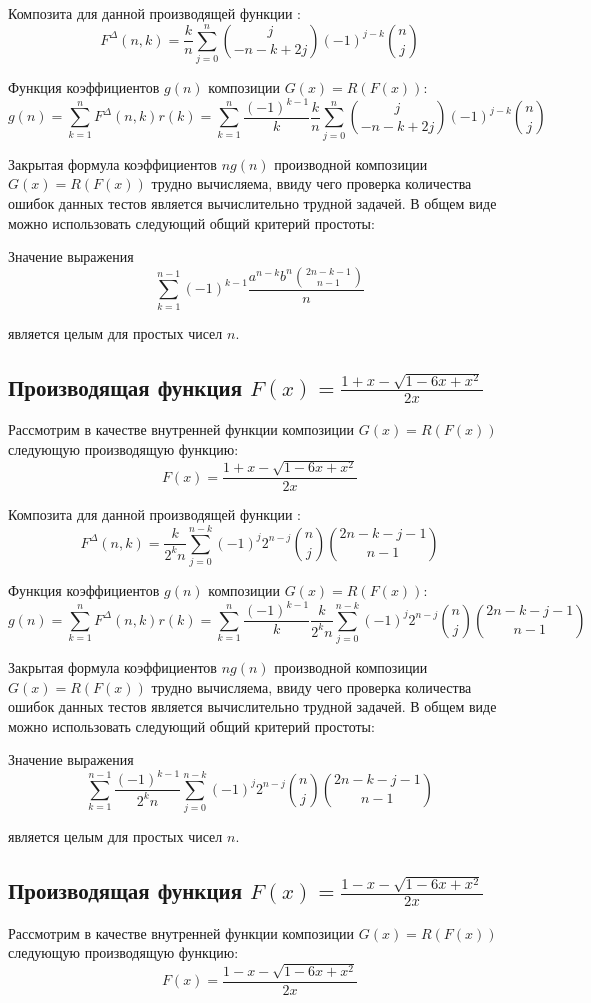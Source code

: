 \documentclass[
russian,
cp1251,
14pt,
simple
]{eskdtext}
\theoremstyle{definition}
\begin{document}
Композита для данной производящей функции \cite{KruchininVV}:
$$
F^\Delta(n,k)=\frac{k}{n} \sum\limits _{j=0}^n{j \choose -n-k+2j}(-1)^{j-k}{n \choose j}
$$

Функция коэффициентов $g(n)$ композиции $G(x)=R(F(x))$:
$$
g(n)=\sum\limits _{k=1}^{n}{F^\Delta(n,k)r(k)}=\sum\limits _{k=1}^{n}\frac{(-1)^{k-1}}{k} 
\frac{k}{n} \sum\limits _{j=0}^n{j \choose -n-k+2j}(-1)^{j-k}{n \choose j}
$$

Закрытая формула коэффициентов $ng(n)$ производной композиции $G(x)=R(F(x))$ трудно вычисляема, ввиду чего проверка количества ошибок данных тестов является вычислительно трудной задачей. В общем виде можно использовать следующий общий критерий простоты:

Значение выражения
$$
\sum\limits _{k=1}^{n-1}(-1)^{k-1}\frac{a^{n-k}b^n{2n-k-1 \choose n-1}}{n}
$$

является целым для простых чисел $n$.

\subsection{Производящая функция $F(x)=\frac{1+x-\sqrt{1-6x+x^2}}{2x}$}
Рассмотрим в качестве внутренней функции композиции $G(x)=R(F(x))$ следующую производящую функцию:
$$
F(x)=\frac{1+x-\sqrt{1-6x+x^2}}{2x}
$$

Композита для данной производящей функции \cite{KruchininVV}:
$$
F^\Delta(n,k)=\frac{k}{2^kn} \sum\limits _{j=0}^{n-k}(-1)^j2^{n-j}{n \choose j}{2n-k-j-1 \choose n-1}
$$

Функция коэффициентов $g(n)$ композиции $G(x)=R(F(x))$:
$$
g(n)=\sum\limits _{k=1}^{n}{F^\Delta(n,k)r(k)}=\sum\limits _{k=1}^{n}\frac{(-1)^{k-1}}{k} 
\frac{k}{2^kn} \sum\limits _{j=0}^{n-k}(-1)^j2^{n-j}{n \choose j}{2n-k-j-1 \choose n-1}
$$

Закрытая формула коэффициентов $ng(n)$ производной композиции $G(x)=R(F(x))$ трудно вычисляема, ввиду чего проверка количества ошибок данных тестов является вычислительно трудной задачей. В общем виде можно использовать следующий общий критерий простоты:

Значение выражения
$$
\sum\limits _{k=1}^{n-1}\frac{(-1)^{k-1}}{2^kn}\sum\limits _{j=0}^{n-k}(-1)^j2^{n-j}{n \choose j}{2n-k-j-1 \choose n-1}
$$

является целым для простых чисел $n$.

\subsection{Производящая функция $F(x)=\frac{1-x-\sqrt{1-6x+x^2}}{2x}$}
Рассмотрим в качестве внутренней функции композиции $G(x)=R(F(x))$ следующую производящую функцию:
$$
F(x)=\frac{1-x-\sqrt{1-6x+x^2}}{2x}
$$
\end{document}
